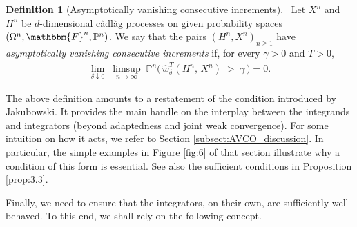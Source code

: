 \documentclass[11pt]{article}
\theoremstyle{definition}\newtheorem{example}[theorem]{Example}
\theoremstyle{definition}\newtheorem{counterexample}[theorem]{Counterexample}
\theoremstyle{definition}\newtheorem{remark}[theorem]{Remark}
\theoremstyle{definition}\newtheorem{defi}[theorem]{Definition}
\numberwithin{equation}{section}
\newcommand{\Pro}{\mathbb{P}}										%
\renewcommand{\|}{\; : \, \;}											%
\begin{document}
\begin{defi}[Asymptotically vanishing consecutive increments]\label{def:avco} \
	Let $X^n$ and $H^n$ be $d$-dimensional càdlàg processes on given probability spaces $(\Omega^n, \mathbbm{F}^n, \Pro^n)$. We say that the pairs $(H^n, X^n)_{n\ge 1}$ have \emph{asymptotically vanishing consecutive increments} if, for every $\gamma>0$ and $T> 0$,
	\begin{align} 
		\lim\limits_{\delta \downarrow 0}  \; \limsup\limits_{n\rightarrow \infty} \; \Pro^n\bigl( \, \hat w_{\delta}^T(H^n, \, X^n) \; > \; \gamma \, \bigr)  =  0. \tag{AVCI} \label{eq:oscillcond}
	\end{align}
\end{defi}

The above definition amounts to a restatement of the condition \cite[Eq.~(6)]{jakubowski} introduced by Jakubowski. It provides the main handle on the interplay between the integrands and integrators (beyond adaptedness and joint weak convergence). For some intuition on how it acts, we refer to Section \ref{subsect:AVCO_discussion}. In particular, the simple examples in Figure \ref{fig:6} of that section illustrate why a condition of this form is essential. See also the sufficient conditions in Proposition \ref{prop:3.3}.


Finally, we need to ensure that the integrators, on their own, are sufficiently well-behaved. To this end, we shall rely on the following concept. 
\end{document}
